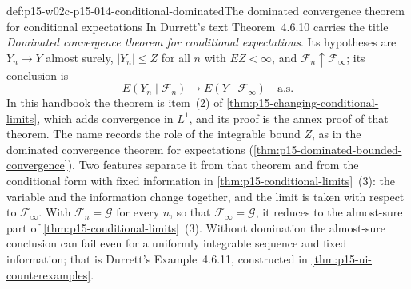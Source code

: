 \begin{hbconvention}{def:p15-w02c-p15-014-conditional-dominated}{The dominated convergence theorem for conditional expectations}
In Durrett's text \cite[Theorem~4.6.10, p.~248]{DurrettPTEAuthor2019}
Theorem~4.6.10 carries the title \emph{Dominated convergence theorem
for conditional expectations}. Its hypotheses are
\(Y_n\to Y\) almost surely, \(|Y_n|\leq Z\) for all \(n\) with
\(EZ<\infty\), and \(\mathcal F_n\uparrow\mathcal F_\infty\); its
conclusion is
\[
 E(Y_n\mid\mathcal F_n)\to E(Y\mid\mathcal F_\infty)\quad\text{a.s.}
\]
In this handbook the theorem is item~(2) of
\cref{thm:p15-changing-conditional-limits}, which adds convergence in
\(L^1\), and its proof is the annex proof of that theorem. The name
records the role of the integrable bound \(Z\), as in the dominated
convergence theorem for expectations
(\cref{thm:p15-dominated-bounded-convergence}). Two features separate
it from that theorem and from the conditional form with fixed
information in \cref{thm:p15-conditional-limits}~(3): the variable and
the information change together, and the limit is taken with respect to
\(\mathcal F_\infty\). With \(\mathcal F_n=\mathcal G\) for every \(n\),
so that \(\mathcal F_\infty=\mathcal G\), it reduces to the almost-sure
part of \cref{thm:p15-conditional-limits}~(3). Without domination the
almost-sure conclusion can fail even for a uniformly integrable
sequence and fixed information; that is Durrett's Example~4.6.11, constructed in
\cref{thm:p15-ui-counterexamples}.
\end{hbconvention}

